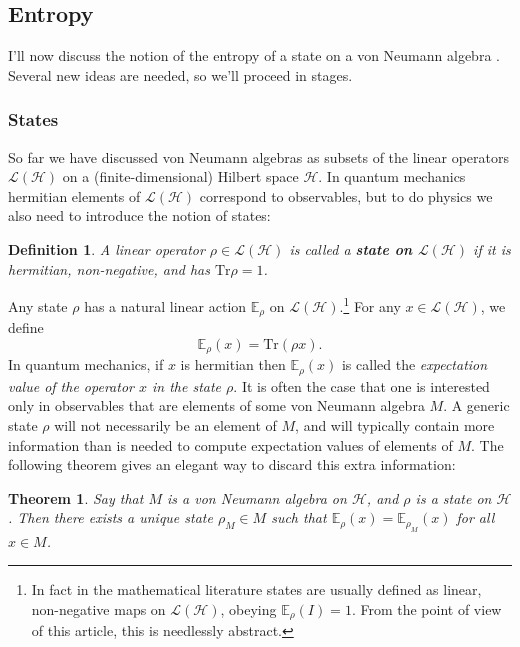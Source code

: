 \documentclass[12pt]{article}
\newcommand{\be}{\begin{equation}}
\newcommand{\ee}{\end{equation}}
\newcommand{\Tr}{\mathrm{Tr}}
\newcommand{\Ll}{\mathcal{L}}
\newcommand{\Hh}{\mathcal{H}}
\newcommand{\LH}{\Ll(\Hh)}
\newtheorem{mydef}{Definition}[section]
\newtheorem{thm}{Theorem}[section]
\begin{document}
\subsection{Entropy}\label{entapp}
I'll now discuss the notion of the entropy of a state on a von Neumann algebra \cite{ohya2004quantum,Casini:2013rba}.  Several new ideas are needed, so we'll proceed in stages.
\subsubsection{States}
So far we have discussed von Neumann algebras as subsets of the linear operators $\Ll(\Hh)$ on a (finite-dimensional) Hilbert space $\Hh$.  In quantum mechanics hermitian elements of $\LH$ correspond to observables, but to do physics we also need to introduce the notion of states:
\begin{mydef}
A linear operator $\rho\in \LH$ is called a \textbf{state on $\LH$} if it is hermitian, non-negative, and has $\Tr\rho=1$.  
\end{mydef}
Any state $\rho$ has a natural linear action $\mathbb{E}_\rho$ on  $\LH$.\footnote{In fact in the mathematical literature states are usually defined as linear, non-negative maps on $\LH$, obeying $\mathbb{E}_\rho(I)=1$.  From the point of view of this article, this is needlessly abstract.}
 For any $x\in \LH$, we define
\be
\mathbb{E}_\rho (x)=\Tr(\rho x).
\ee
In quantum mechanics, if $x$ is hermitian then $\mathbb{E}_\rho(x)$ is called the \textit{expectation value of the operator $x$ in the state $\rho$}.
It is often the case that one is interested only in observables that are elements of some von Neumann algebra $M$.  A generic state $\rho$ will not necessarily be an element of $M$, and will typically contain more information than is needed to compute expectation values of elements of $M$.  The following theorem gives an elegant way to discard this extra information:
\begin{thm}\label{rhoM}
Say that $M$ is a von Neumann algebra on $\Hh$, and $\rho$ is a state on $\Hh$.  Then there exists a unique state $\rho_M\in M$ such that $\mathbb{E}_\rho(x)=\mathbb{E}_{\rho_M}(x)$ for all $x\in M$.
\end{thm}
\end{document}
